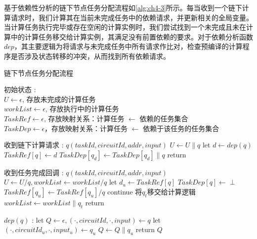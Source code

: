 基于依赖性分析的链下节点任务分配流程如\autoref{alg:ch4-3}所示。每当收到一个链下计算请求时，我们计算其在当前未完成任务中的依赖请求，并更新相关的全局变量。当计算任务执行完毕或存在空闲的计算实例时，我们尝试找到一个未完成且未在计算中的计算任务移交给计算实例，其满足没有前置依赖的要求。对于依赖分析函数$dep$，其主要逻辑为将请求与未完成任务中所有请求作比对，检查预编译的计算程序是否涉及状态转移的冲突，从而找到所有依赖请求。
\begin{breakablealgorithm}
    \caption{链下节点任务分配流程}
    \label{alg:ch4-3}
    \begin{algorithmic} 
    \item [初始状态]: 
    \\ $U \leftarrow \epsilon$, 存放未完成的计算任务
    \\ $workList \leftarrow \epsilon$, 存放执行中的计算任务
    \\ $TaskRef \leftarrow \epsilon$, 存放映射关系：计算任务 $\leftarrow$ 依赖的任务集合
    \\ $TaskDep \leftarrow \epsilon$，存放映射关系：计算任务 $\leftarrow$ 依赖于该任务的任务集合
    \item [收到链下计算请求]: $q(taskId, circuitId, addr, input)$
    \STATE $U \leftarrow U \parallel q$
    \STATE let $d \leftarrow dep(q)$
    \STATE $TaskRef[q] \leftarrow d$
    \STATE $TaskDep[q_d] \leftarrow TaskDep[q_d] \parallel q$
    \ENDFOR
    \STATE return
    \item [收到任务完成回调]: $q(taskId, circuitId, addr, input)$
    \STATE $U \leftarrow U / q, workList \leftarrow workList / q$
    \STATE let $d_u \leftarrow TaskRef[q]$
    \STATE $TaskDep[q] \leftarrow \perp$
    \STATE $TaskRef[q_u] \leftarrow TaskRef[q_u] / q$
    \ENDFOR
    \STATE continue
    \ENDIF
    \STATE 将$q_t$移交给计算逻辑
    \STATE $workList \leftarrow workList \parallel q_t$
    \STATE return
    \ENDIF
    \ENDFOR

    \noindent\hrulefill
    \item [$dep(q)$]:
    \STATE let $Q \leftarrow \epsilon, (\cdot, circuitId, \cdot, input) \leftarrow q$
    \STATE let $(\cdot, circuitId_u, \cdot, input_u) \leftarrow q_u$
    \STATE $Q \leftarrow Q \parallel q_u$
    \ENDIF
    \ENDFOR
    \STATE return $Q$
    \end{algorithmic}
\end{breakablealgorithm}